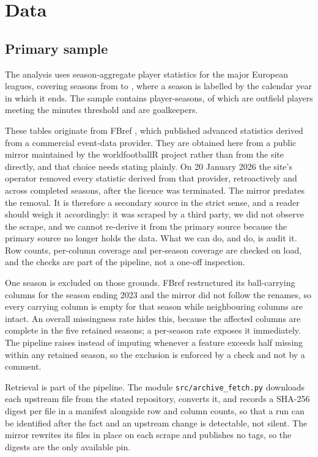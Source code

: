 \section{Data}
\label{sec:data}

\subsection{Primary sample}

The analysis uses season-aggregate player statistics for the \ArcNLeagues{} major European
leagues, covering \ArcNSeasons{} seasons from \ArcSeasonFirst{} to \ArcSeasonLast{}, where
a season is labelled by the calendar year in which it ends. The sample contains
\ArcRows{} player-seasons, of which \ArcEligible{} are outfield players meeting the minutes
threshold and \ArcKeepers{} are goalkeepers.

These tables originate from FBref \citep{fbref2026}, which published advanced statistics
derived from a commercial event-data provider. They are obtained here from a public mirror maintained by
the worldfootballR project \citep{zivkovic2026worldfootballr} rather than from the site
directly, and that choice needs stating plainly. On 20 January 2026 the site's operator
removed every
statistic derived from that provider, retroactively and across completed seasons, after the
licence was terminated. The mirror predates the removal. It is therefore a secondary source
in the strict sense, and a reader should weigh it accordingly: it was scraped by a third
party, we did not observe the scrape, and we cannot re-derive it from the primary source
because the primary source no longer holds the data. What we can do, and do, is audit it.
Row counts, per-column coverage and per-season coverage are checked on load, and the checks
are part of the pipeline, not a one-off inspection.

One season is excluded on those grounds. FBref restructured its ball-carrying columns for
the season ending 2023 and the mirror did not follow the renames, so every carrying column
is empty for that season while neighbouring columns are intact. An overall missingness rate
hides this, because the affected columns are complete in the five retained seasons; a
per-season rate exposes it immediately. The pipeline raises instead of imputing whenever a
feature exceeds half missing within any retained season, so the exclusion is enforced by a
check and not by a comment.

Retrieval is part of the pipeline. The module \texttt{src/archive\_fetch.py} downloads each
upstream file from the stated repository, converts it, and records a SHA-256 digest per file
in a manifest alongside row and column counts, so that a run can be identified after the fact
and an upstream change is detectable, not silent. The mirror rewrites its files in
place on each scrape and publishes no tags, so the digests are the only available pin.


